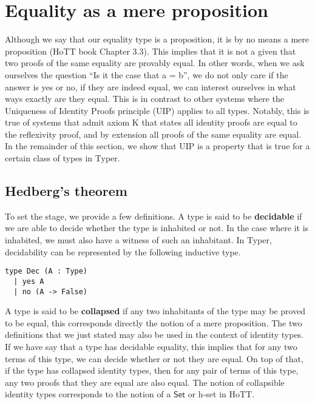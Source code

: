 \documentclass[12pt,twoside,maitrise]{dms}
\theoremstyle{definition}
\numberwithin{equation}{section}
\numberwithin{table}{chapter}
\numberwithin{figure}{chapter}
\newcommand\kw[1] {\textsf{#1}}
\begin{document}
\section{Equality as a mere proposition}
Although we say that our equality type is a proposition, it is by no means a
mere proposition (HoTT book\cite{HoTTbook} Chapter 3.3). This implies that it is
not a given that two proofs of the same equality are provably
equal\cite{hofmann1998groupoid}. In other words, when we ask ourselves the
question ``Is it the case that a = b'', we do not only care if the answer is yes
or no, if they are indeed equal, we can interest ourselves in what ways exactly
are they equal. This is in contrast to other systems where the Uniqueness of
Identity Proofs principle (UIP) applies to all types. Notably, this is true of
systems that admit axiom K\cite{streicher1993investigations} that states all
identity proofs are equal to the reflexivity proof, and by extension all proofs
of the same equality are equal. In the remainder of this section, we show that
UIP is a property that is true for a certain class of types in Typer.

\subsection{Hedberg's theorem}\label{subsec:hedberg}

To set the stage, we provide a few definitions. A type is said to be
\textbf{decidable} if we are able to decide whether the type is inhabited or
not. In the case where it is inhabited, we must also have a witness of such an
inhabitant. In Typer, decidability can be represented by the following inductive
type.

\begin{verbatim}
type Dec (A : Type)
  | yes A
  | no (A -> False)
\end{verbatim}

A type is said to be \textbf{collapsed} if any two inhabitants of the type may
be proved to be equal, this corresponds directly the notion of a mere
proposition. The two definitions that we just stated may also be used in the
context of identity types. If we have say that a type has decidable equality,
this implies that for any two terms of this type, we can decide whether or not
they are equal. On top of that, if the type has collapsed identity types, then
for any pair of terms of this type, any two proofs that they are equal are also
equal. The notion of collapsible identity types corresponds to the notion of a
$\kw{Set}$ or h-set in HoTT.
\end{document}
